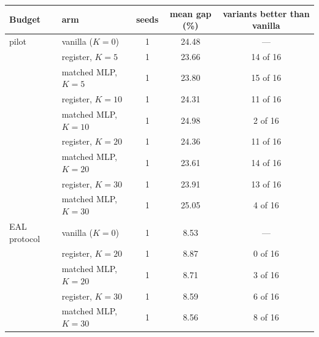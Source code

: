\begin{tabular}{llccc}
\toprule
Budget & arm & seeds & mean gap (\%) & variants better than vanilla \\
\midrule
pilot & vanilla ($K{=}0$) & 1 & 24.48 & --- \\
 & register, $K{=}5$ & 1 & 23.66 & 14 of 16 \\
 & matched MLP, $K{=}5$ & 1 & 23.80 & 15 of 16 \\
 & register, $K{=}10$ & 1 & 24.31 & 11 of 16 \\
 & matched MLP, $K{=}10$ & 1 & 24.98 & 2 of 16 \\
 & register, $K{=}20$ & 1 & 24.36 & 11 of 16 \\
 & matched MLP, $K{=}20$ & 1 & 23.61 & 14 of 16 \\
 & register, $K{=}30$ & 1 & 23.91 & 13 of 16 \\
 & matched MLP, $K{=}30$ & 1 & 25.05 & 4 of 16 \\
\midrule
EAL protocol & vanilla ($K{=}0$) & 1 & 8.53 & --- \\
 & register, $K{=}20$ & 1 & 8.87 & 0 of 16 \\
 & matched MLP, $K{=}20$ & 1 & 8.71 & 3 of 16 \\
 & register, $K{=}30$ & 1 & 8.59 & 6 of 16 \\
 & matched MLP, $K{=}30$ & 1 & 8.56 & 8 of 16 \\
\bottomrule
\end{tabular}

